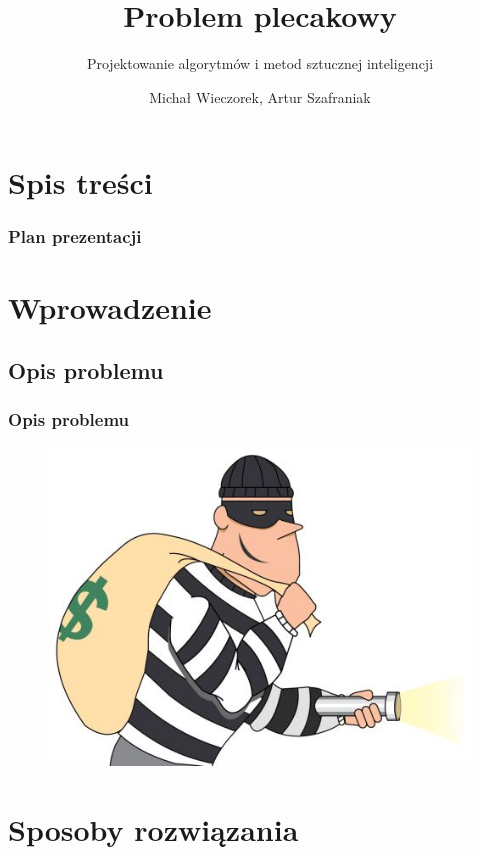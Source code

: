 \documentclass{beamer}
\title{Problem plecakowy}
\subtitle{Projektowanie algorytmów i metod sztucznej inteligencji}
\author{Michał Wieczorek, Artur Szafraniak}
\institute{
Automatyka i Robotyka,
Wydział Elektroniki\\
Politechnika Wrocławska}
\begin{document}
\begin{frame}
\titlepage
\end{frame}

\section{Spis treści}
\begin{frame}
	\frametitle{Plan prezentacji}
	\tableofcontents
\end{frame}

\section{Wprowadzenie}
\subsection{Opis problemu}
\begin{frame}
	\frametitle{Opis problemu}
	\begin{figure}[H]
	\centering
	\includegraphics[scale=0.3]{zlodziej2.png}
	\end{figure}
\end{frame}

\section{Sposoby rozwiązania}
\end{document}
